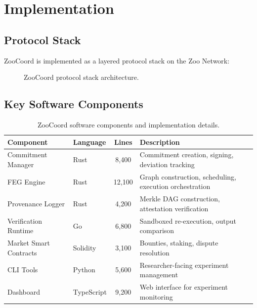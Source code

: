 \section{Implementation}

\label{sec:implementation}

\subsection{Protocol Stack}

ZooCoord is implemented as a layered protocol stack on the Zoo Network:

\begin{figure}[H]
\centering
{}
\caption{ZooCoord protocol stack architecture.}
\label{fig:stack}
\end{figure}

\subsection{Key Software Components}

\begin{table}[H]
\centering
\caption{ZooCoord software components and implementation details.}
\label{tab:components}
\begin{tabularx}{\textwidth}{@{}llcX@{}}
\toprule
\textbf{Component} & \textbf{Language} & \textbf{Lines} & \textbf{Description} \\
\midrule
Commitment Manager & Rust & 8,400 & Commitment creation, signing, deviation tracking \\
FEG Engine & Rust & 12,100 & Graph construction, scheduling, execution orchestration \\
Provenance Logger & Rust & 4,200 & Merkle DAG construction, attestation verification \\
Verification Runtime & Go & 6,800 & Sandboxed re-execution, output comparison \\
Market Smart Contracts & Solidity & 3,100 & Bounties, staking, dispute resolution \\
CLI Tools & Python & 5,600 & Researcher-facing experiment management \\
Dashboard & TypeScript & 9,200 & Web interface for experiment monitoring \\
\bottomrule
\end{tabularx}
\end{table}

